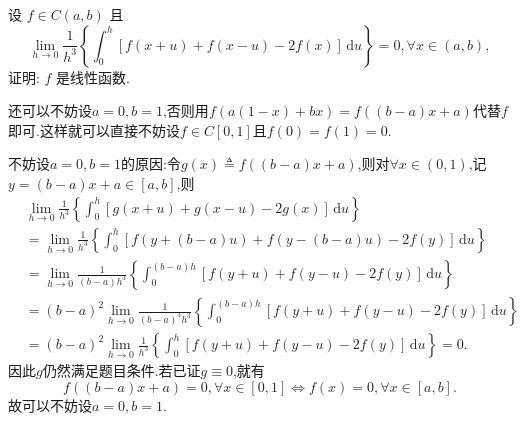 \documentclass[../../main.tex]{subfiles}
\begin{document}
\begin{example}
设 $f \in C(a,b)$ 且
\[
\lim_{h \to 0} \frac{1}{h^3} \left\{ \int_0^h [f(x + u) + f(x - u) - 2f(x)] \, \mathrm{d}u \right\} = 0, \forall x \in (a,b),
\]
证明: $f$ 是线性函数.
\end{example}
\begin{note}
还可以不妨设$a=0,b=1$,否则用$f(a(1-x)+bx)=f((b-a)x+a)$代替$f$即可.这样就可以直接不妨设$f\in C[0,1]$且$f(0)=f(1)=0.$

不妨设$a=0,b=1$的原因:令$g\left( x \right) \triangleq f\left( \left( b-a \right) x+a \right) $,则对$\forall x\in \left( 0,1 \right) $,记$y=\left( b-a \right) x+a\in \left[ a,b \right] $,则
\begin{align*}
&\lim_{h\rightarrow 0} \frac{1}{h^3}\left\{ \int_0^h{[g(x+u)+g(x-u)-2g(x)]\,\mathrm{d}u} \right\} 
\\&=\lim_{h\rightarrow 0} \frac{1}{h^3}\left\{ \int_0^h{[f\left( y+\left( b-a \right) u \right) +f\left( y-\left( b-a \right) u \right) -2f\left( y \right) ]\,\mathrm{d}u} \right\} 
\\&=\lim_{h\rightarrow 0} \frac{1}{\left( b-a \right) h^3}\left\{ \int_0^{\left( b-a \right) h}{[f\left( y+u \right) +f\left( y-u \right) -2f\left( y \right) ]\,\mathrm{d}u} \right\} 
\\&=\left( b-a \right) ^2\lim_{h\rightarrow 0} \frac{1}{\left( b-a \right) ^3h^3}\left\{ \int_0^{\left( b-a \right) h}{[f\left( y+u \right) +f\left( y-u \right) -2f\left( y \right) ]\,\mathrm{d}u} \right\} 
\\&=\left( b-a \right) ^2\lim_{h\rightarrow 0} \frac{1}{h^3}\left\{ \int_0^h{[f\left( y+u \right) +f\left( y-u \right) -2f\left( y \right) ]\,\mathrm{d}u} \right\} 
=0.
\end{align*}
因此$g$仍然满足题目条件.若已证$g\equiv 0$,就有
\[
f\left( \left( b-a \right) x+a \right) =0,\forall x\in \left[ 0,1 \right] \Longleftrightarrow f\left( x \right) =0,\forall x\in \left[ a,b \right] .
\]
故可以不妨设$a=0,b=1.$
\end{note}
\end{document}
